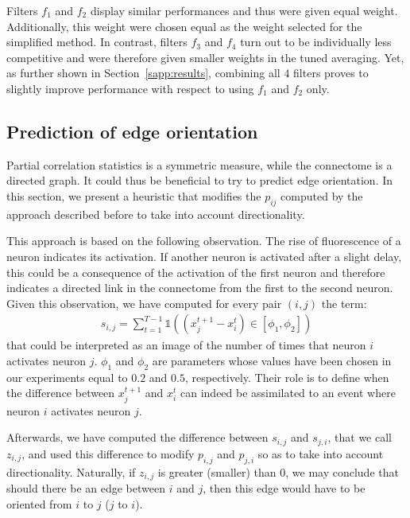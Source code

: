 \documentclass[wcp]{jmlr}
\begin{document}
Filters $f_1$ and $f_2$ display similar performances and thus were given equal
weight. Additionally, this weight were chosen equal as the weight selected for the simplified method. In contrast, filters $f_3$
and $f_4$ turn out to be individually less competitive and were therefore given
smaller weights in the tuned averaging. Yet, as further shown in
Section~\ref{sapp:results}, combining all $4$ filters proves to slightly
improve performance with respect to using $f_1$ and $f_2$ only.



\subsection{Prediction of edge orientation}
\label{sapp:connectome}

Partial  correlation  statistics is  a  symmetric  measure, while  the
connectome is a directed graph. It  could thus be beneficial to try to
predict edge orientation. In this section, we present a heuristic that
modifies the  $p_{ij}$ computed  by the  approach described  before to
take into account directionality.

This approach is based on the following
observation. The rise of fluorescence of a neuron indicates its
activation. If another neuron is activated after a slight delay, this
could be a consequence of the activation of the first neuron and
therefore indicates a directed link in the connectome from the first to
the second neuron.  Given this observation, we have computed for every
pair $(i,j)$ the term:
\begin{align}
s_{i,j} = \sum_{t=1}^{T - 1} \mathbb{1}((x_j^{t+1} - x_i^t) \in \left[\phi_1, \phi_2\right])
\end{align}
that could be interpreted as an image of the  number of times
that neuron $i$ activates neuron $j$. $\phi_1$ and $\phi_2$ are
parameters whose values have been chosen in our experiments equal to   
$0.2$ and $0.5$, respectively. Their role is to 
define when the difference between $x_j^{t+1}$  and $x_i^t$ can
indeed be assimilated to an event where neuron $i$ activates neuron
$j$.

Afterwards, we have computed the difference between $s_{i,j}$ and
$s_{j,i}$, that we call $z_{i,j}$, and used this difference to modify  $p_{i,j}$ and
$p_{j,i}$ so as to take into account directionality. Naturally, if
$z_{i,j}$ is greater  (smaller) than $0$, we may conclude that should there  be an
edge between $i$ and $j$, then this edge would have to be oriented
from $i$ to $j$ ($j$ to $i$). 
\end{document}
